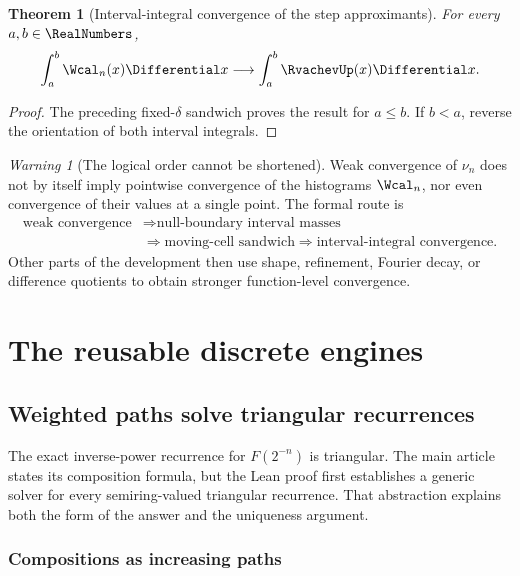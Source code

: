 \documentclass[11pt,oneside]{article}
\newtheorem{theorem}{Theorem}[section]
\theoremstyle{definition}
\theoremstyle{remark}
\newtheorem{warning}[warning]{Warning}
\begin{document}
\begin{theorem}[Interval-integral convergence of the step approximants]
\label{integration:thm:step-integral-convergence}
For every $a,b\in\RealNumbers$,
\begin{equation}
 \int_a^b\Wcal_n(x)\Differential x
 \longrightarrow
 \int_a^b\RvachevUp(x)\Differential x.
 \label{integration:eq:step-integral-convergence}
\end{equation}
\end{theorem}

\begin{proof}
The preceding fixed-$\delta$ sandwich proves the result for $a\le b$.  If $b<a$, reverse the
orientation of both interval integrals.
\end{proof}

\begin{warning}[The logical order cannot be shortened]
Weak convergence of $\nu_n$ does not by itself imply pointwise convergence of the
histograms $\Wcal_n$, nor even convergence of their values at a single point.  The formal
route is
\[
\begin{aligned}
 \text{weak convergence}
 &\Longrightarrow \text{null-boundary interval masses}\\
 &\Longrightarrow \text{moving-cell sandwich}
 \Longrightarrow \text{interval-integral convergence}.
\end{aligned}
\]
Other parts of the development then use shape, refinement, Fourier decay, or difference
quotients to obtain stronger function-level convergence.
\end{warning}

\section{The reusable discrete engines}

\subsection{Weighted paths solve triangular recurrences}
\label{integration:sec:path-sums}

The exact inverse-power recurrence for $F(2^{-n})$ is triangular.  The main article states its
composition formula, but the Lean proof first establishes a generic solver for every
semiring-valued triangular recurrence.  That abstraction explains both the form of the
answer and the uniqueness argument.

\subsubsection{Compositions as increasing paths}
\end{document}
